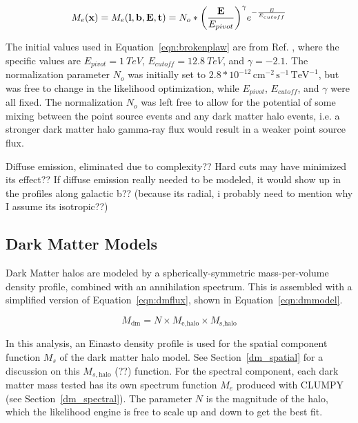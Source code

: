   \begin{equation}\label{eqn:brokenplaw}
    M_e(\mathbf{x }) = M_e(\mathbf{l },\mathbf{b },\mathbf{E },\mathbf{t }) = N_o * { \left ( \frac{\mathbf{E }}{E_{pivot}} \right ) }^{\gamma} {e}^{-\frac{E}{E_{cutoff}}}
  \end{equation}
  
  The initial values used in Equation~\ref{eqn:brokenplaw} are from Ref. \cite{VeritasGCRidge2015}, where the specific values are $E_{pivot}=\SI{1}{TeV}$, $E_{cutoff}=\SI{12.8}{TeV}$, and $\gamma=-2.1$.
  The normalization parameter $N_o$ was initially set to $2.8*{10}^{-12}\,\text{cm}^{-2}\,\text{s}^{-1}\,\text{TeV}^{-1}$, but was free to change in the likelihood optimization, while $E_{pivot}$, $E_{cutoff}$, and $\gamma$ were all fixed.
  The normalization $N_o$ was left free to allow for the potential of some mixing between the point source events and any dark matter halo events, i.e. a stronger dark matter halo gamma-ray flux would result in a weaker point source flux.
  
  {\color{red}
  Diffuse emission, eliminated due to complexity??
  Hard cuts may have minimized its effect??
  If diffuse emission really needed to be modeled, it would show up in the profiles along galactic b??
  (because its radial, i probably need to mention why I assume its isotropic??)
  }
  
  \subsection{Dark Matter Models}\label{subsec:dmhalomodel}
  Dark Matter halos are modeled by a spherically-symmetric mass-per-volume density profile, combined with an annihilation spectrum.
  This is assembled with a simplified version of Equation~\ref{eqn:dmflux}, shown in Equation~\ref{eqn:dmmodel}.
  
  \begin{equation}\label{eqn:dmmodel}
    M_{\textrm{dm}} = N \times M_{\textrm{e,halo}} \times M_{\textrm{s,halo}}
  \end{equation}
  
  In this analysis, an Einasto density profile is used for the spatial component function $M_s$ of the dark matter halo model.
  See Section~\ref{dm_spatial} for a discussion on this {\color{red} $M_{s,\textrm{halo}}$ (??)} function.
  For the spectral component, each dark matter mass tested has its own spectrum function $M_e$ produced with CLUMPY (see Section~\ref{dm_spectral}).
  The parameter $N$ is the magnitude of the halo, which the likelihood engine is free to scale up and down to get the best fit.

